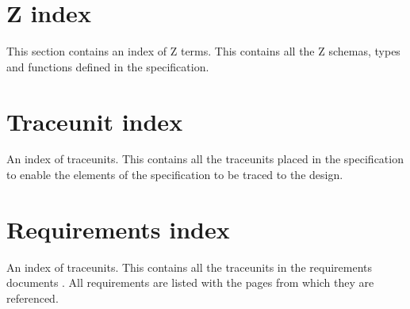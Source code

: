 \documentclass{pxcsdoc}
\begin{document}






\appendix








\chapter{Z index}

This section contains an index of Z terms.
This contains all the Z schemas, types and functions
defined in the specification. 

\begin{multicols}{2}\scriptsize
\begin{theindex}

\end{theindex}
\end{multicols}

\chapter{Traceunit index}

An index of traceunits. This contains all the traceunits placed in the
specification to enable the elements of the specification to be traced to
the design.

\begin{multicols}{2}\scriptsize
\begin{theindex}

\end{theindex}
\end{multicols}

\chapter{Requirements index}

An index of traceunits. This contains all the traceunits in the 
requirements documents . All requirements are listed with the pages
from which they are referenced. 

\begin{multicols}{2}\scriptsize
\begin{theindex}

\end{theindex}
\end{multicols}

\end{document}
